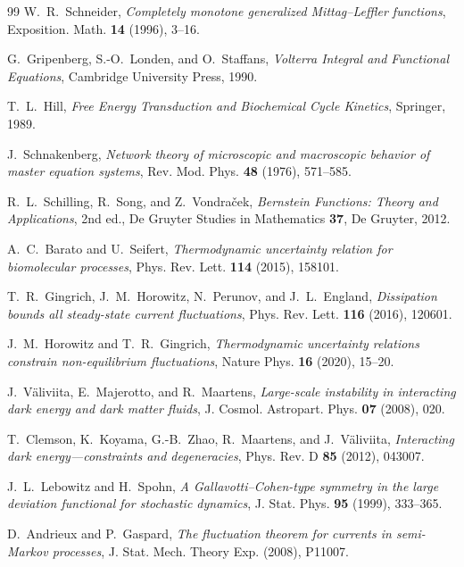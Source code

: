\documentclass[11pt]{article}
\theoremstyle{definition}
\theoremstyle{remark}
\begin{document}
\begin{thebibliography}{99}
W.~R.~Schneider,
\emph{Completely monotone generalized Mittag--Leffler functions},
Exposition. Math. \textbf{14} (1996), 3--16.

G.~Gripenberg, S.-O.~Londen, and O.~Staffans,
\emph{Volterra Integral and Functional Equations},
Cambridge University Press, 1990.

T.~L.~Hill, \emph{Free Energy Transduction and Biochemical Cycle Kinetics},
Springer, 1989.

J.~Schnakenberg, \emph{Network theory of microscopic and macroscopic behavior
of master equation systems}, Rev. Mod. Phys. \textbf{48} (1976), 571--585.

R.~L.~Schilling, R.~Song, and Z.~Vondra\v{c}ek,
\emph{Bernstein Functions: Theory and Applications}, 2nd ed.,
De Gruyter Studies in Mathematics \textbf{37}, De Gruyter, 2012.

A.~C.~Barato and U.~Seifert,
\emph{Thermodynamic uncertainty relation for biomolecular processes},
Phys. Rev. Lett. \textbf{114} (2015), 158101.

T.~R.~Gingrich, J.~M.~Horowitz, N.~Perunov, and J.~L.~England,
\emph{Dissipation bounds all steady-state current fluctuations},
Phys. Rev. Lett. \textbf{116} (2016), 120601.

J.~M.~Horowitz and T.~R.~Gingrich,
\emph{Thermodynamic uncertainty relations constrain non-equilibrium fluctuations},
Nature Phys. \textbf{16} (2020), 15--20.

J.~V\"aliviita, E.~Majerotto, and R.~Maartens,
\emph{Large-scale instability in interacting dark energy and dark matter fluids},
J. Cosmol. Astropart. Phys. \textbf{07} (2008), 020.

T.~Clemson, K.~Koyama, G.-B.~Zhao, R.~Maartens, and J.~V\"aliviita,
\emph{Interacting dark energy---constraints and degeneracies},
Phys. Rev. D \textbf{85} (2012), 043007.

J.~L.~Lebowitz and H.~Spohn,
\emph{A Gallavotti--Cohen-type symmetry in the large deviation functional for
stochastic dynamics},
J. Stat. Phys. \textbf{95} (1999), 333--365.

D.~Andrieux and P.~Gaspard,
\emph{The fluctuation theorem for currents in semi-Markov processes},
J. Stat. Mech. Theory Exp. (2008), P11007.


\end{thebibliography}
\end{document}
